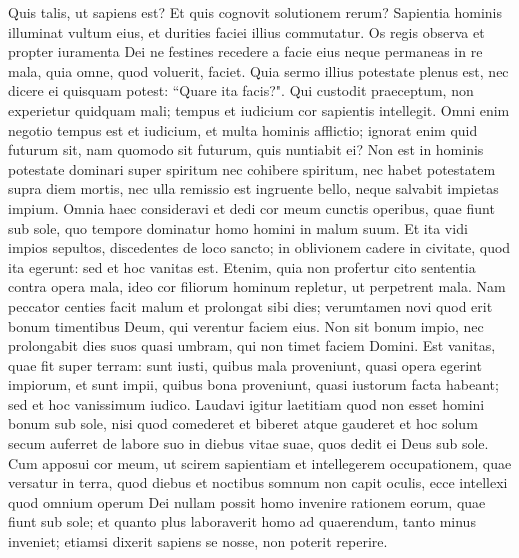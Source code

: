 \begin{biblechapter}  
\verse Quis talis, ut sapiens est? Et quis cognovit solutionem rerum? Sapientia hominis illuminat vultum eius, et durities faciei illius commutatur. 
\verse Os regis observa et propter iuramenta Dei 
\verse ne festines recedere a facie eius neque permaneas in re mala, quia omne, quod voluerit, faciet. 
\verse Quia sermo illius potestate plenus est, nec dicere ei quisquam potest: “Quare ita facis?". 
\verse Qui custodit praeceptum, non experietur quidquam mali; tempus et iudicium cor sapientis intellegit. 
\verse Omni enim negotio tempus est et iudicium, et multa hominis afflictio; 
\verse ignorat enim quid futurum sit, nam quomodo sit futurum, quis nuntiabit ei? 
\verse Non est in hominis potestate dominari super spiritum nec cohibere spiritum, nec habet potestatem supra diem mortis, nec ulla remissio est ingruente bello, neque salvabit impietas impium. 
\verse Omnia haec consideravi et dedi cor meum cunctis operibus, quae fiunt sub sole, quo tempore dominatur homo homini in malum suum. 
\verse Et ita vidi impios sepultos, discedentes de loco sancto; in oblivionem cadere in civitate, quod ita egerunt: sed et hoc vanitas est. 
\verse Etenim, quia non profertur cito sententia contra opera mala, ideo cor filiorum hominum repletur, ut perpetrent mala. 
\verse Nam peccator centies facit malum et prolongat sibi dies; verumtamen novi quod erit bonum timentibus Deum, qui verentur faciem eius. 
\verse Non sit bonum impio, nec prolongabit dies suos quasi umbram, qui non timet faciem Domini. 
\verse Est vanitas, quae fit super terram: sunt iusti, quibus mala proveniunt, quasi opera egerint impiorum, et sunt impii, quibus bona proveniunt, quasi iustorum facta habeant; sed et hoc vanissimum iudico. 
\verse Laudavi igitur laetitiam quod non esset homini bonum sub sole, nisi quod comederet et biberet atque gauderet et hoc solum secum auferret de labore suo in diebus vitae suae, quos dedit ei Deus sub sole. 
\verse Cum apposui cor meum, ut scirem sapientiam et intellegerem occupationem, quae versatur in terra, quod diebus et noctibus somnum non capit oculis, 
\verse ecce intellexi quod omnium operum Dei nullam possit homo invenire rationem eorum, quae fiunt sub sole; et quanto plus laboraverit homo ad quaerendum, tanto minus inveniet; etiamsi dixerit sapiens se nosse, non poterit reperire. 
\end{biblechapter}

